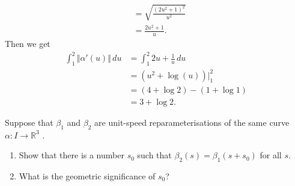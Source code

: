 \documentclass[12 pt, letterpaper]{hmcpset}
\begin{document}
\begin{solution}
\begin{enumerate}
\[\begin{split}
							       & = \sqrt{\frac{(2u^{2} + 1)^{2}}{u^{2}}} \\
							       & = \frac{2u^{2} + 1}{u}.
				\end{split}
			\]
			Then we get
			\[
				\begin{split}
					\int_{1}^{2} \Vert \alpha'(u) \Vert \, du & = \int_{1}^{2} 2u + \frac{1}{u} \, du \\
										  & = (u^{2} + \log(u)) \Big |_{1}^{2} \\
										  & = (4 + \log 2) - (1 + \log 1) \\
										  & = 3 + \log 2.
				\end{split}
			\]
	\end{enumerate}
\end{solution}

\pagebreak

\begin{problem}[Problem 4.]
	Suppose that $\beta_{1}$  and  $\beta_{2}$  are unit-speed reparameterisations of the same curve $\alpha : I \to \mathbb{R}^{3}$ .
	\begin{enumerate}
		\item Show that there is a number $s_{0}$ such that $\beta_{2}(s) = \beta_{1}(s + s_{0})$ for all $s$.
		\item What is the geometric significance of $s_{0}$?
	\end{enumerate}
\end{problem}
\end{document}

